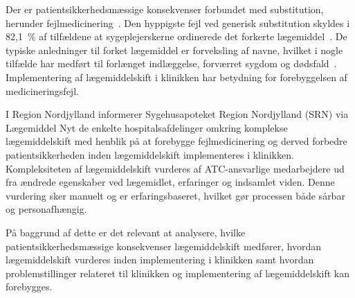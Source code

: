 Der er patientsikkerhedsmæssige konsekvenser forbundet med substitution, herunder fejlmedicinering~\citep{Hakonsen2010}. Den hyppigste fejl ved generisk substitution skyldes i 82,1~\% af tilfældene at sygeplejerskerne ordinerede det forkerte lægemiddel~\citep{Hakonsen2010}. De typiske anledninger til forket lægemiddel er forveksling af navne, hvilket i nogle tilfælde har medført til forlænget indlæggelse, forværret sygdom og dødsfald~\citep{DanskSelskabforPatientsikkerhed2009}. Implementering af lægemiddelskift i klinikken har betydning for forebyggelsen af medicineringsfejl.

I Region Nordjylland informerer Sygehusapoteket Region Nordjylland (SRN) via Lægemiddel Nyt de enkelte hospitalsafdelinger omkring komplekse lægemiddelskift med henblik på at forebygge fejlmedicinering og derved forbedre patientsikkerheden inden lægemiddelskift implementeres i klinikken. Kompleksiteten af lægemiddelskift vurderes af ATC-ansvarlige medarbejdere ud fra ændrede egenskaber ved lægemidlet, erfaringer og indsamlet viden. Denne vurdering sker manuelt og er erfaringsbaseret, hvilket gør processen både sårbar og personafhængig.

På baggrund af dette er det relevant at analysere, hvilke patientsikkerhedsmæssige konsekvenser lægemiddelskift medfører, hvordan lægemiddelskift vurderes inden implementering i klinikken samt hvordan problemstillinger relateret til klinikken og implementering af lægemiddelskift kan forebygges. 
